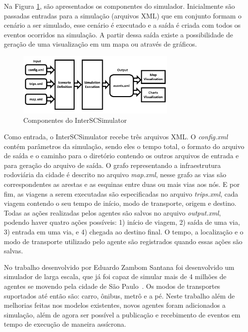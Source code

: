 Na Figura \ref{fig:simulator_components}, são apresentados os componentes do simulador.
Inicialmente são passadas entradas para a simulação (arquivos XML) que em conjunto formam o cenário a ser simulado, esse cenário é executado e a
saída é criada com todos os eventos ocorridos na simulação.
A partir dessa saída existe a possibilidade de geração de uma visualização em um mapa ou através de gráficos.

\begin{figure}[ht]
	\centering
	\includegraphics[width=0.7\textwidth]{figuras/Components.pdf}
	\caption{Componentes do InterSCSimulator}
	\label{fig:simulator_components}
\end{figure}

Como entrada, o InterSCSimulator recebe três arquivos XML. O \textit{config.xml} contém parâmetros da simulação, sendo eles o tempo total, o formato do
arquivo de saída e o caminho para o diretório contendo os outros arquivos de entrada e para geração do arquivo de saída.
O grafo representando a infraestrutura rodoviária da cidade é descrito no arquivo \textit{map.xml}, nesse grafo as vias são correspondentes as arestas e as esquinas entre
duas ou mais vias aos nós.
E por fim, as viagens a serem executadas são especificadas no arquivo \textit{trips.xml}, cada viagem contendo o seu tempo de início, modo de transporte, origem e destino.
Todas as ações realizadas pelos agentes são salvos no arquivo \textit{output.xml}, podendo haver quatro ações possíveis: 1) início de viagem, 2) saída de uma via,
3) entrada em uma via, e 4) chegada ao destino final.
O tempo, a localização e o modo de transporte utilizado pelo agente são registrados quando essas ações são salvas.

No trabalho desenvolvido por Eduardo Zambom Santana foi desenvolvido um simulador de larga escala, que já foi capaz de simular mais de 4 milhões de
agentes se movendo pela cidade de São Paulo~\cite{santana_17}.
Os modos de transportes suportados até então são: carro, ônibus, metrô e a pé.
Neste trabalho além de melhorias feitas nos modelos existentes, novos agentes foram adicionados a simulação, além de agora ser possível a publicação e recebimento de
eventos em tempo de execução de maneira assícrona.

